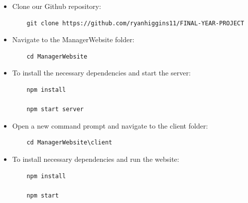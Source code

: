 \begin{itemize}
    \item Clone our Github repository:
    
    \begin{verbatim}
    git clone https://github.com/ryanhiggins11/FINAL-YEAR-PROJECT
    \end{verbatim}
    
    \item Navigate to the ManagerWebsite folder:
    \begin{verbatim}
    cd ManagerWebsite
    \end{verbatim}
    \item To install the necessary dependencies and start the server:
    
    \begin{verbatim}
    npm install
    
    npm start server
    \end{verbatim}
    \item Open a new command prompt and navigate to the client folder: 
    
    \begin{verbatim}
    cd ManagerWebsite\client
    \end{verbatim}
    \item To install necessary dependencies and run the website:
    
    \begin{verbatim}
    npm install
    
    npm start
    \end{verbatim}
\end{itemize}
